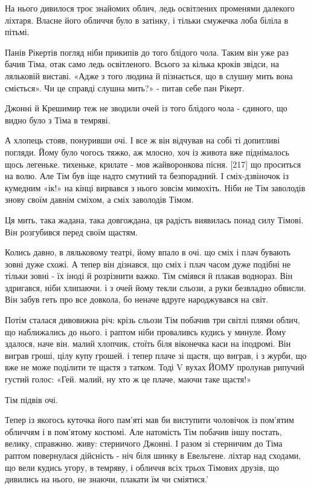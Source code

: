 На нього дивилося троє знайомих облич, ледь освітлених променями далекого ліхтаря. Власне його обличчя було в затінку, і тільки смужечка лоба біліла в пітьмі.

Панів Рікертів погляд ніби прикипів до того блідого чола. Таким він уже раз бачив Тіма, отак само ледь освітленого. Всього за кілька кроків звідси, на ляльковій виставі. «Адже з того людина й пізнається, що в слушну мить вона сміється». Чи це справді слушна мить?» - питав себе пан Рікерт.

Джонні й Крешимир теж не зводили очей із того блідого чола - єдиного, що видно було з Тіма в темряві.

А хлопець стояв, понуривши очі. І все ж він відчував на собі ті допитливі погляди. Йому було чогось тяжко, аж млосно, хоч із живота вже піднімалось щось легеньке. тихеньке, крилате - мов жайворонкова пісня. [217] що проситься на волю. Але Тім був іще надто смутний та безпорадний. І сміх-дзвіночок із кумедним «ік!» на кінці вирвався з нього зовсім мимохіть. Ніби не Тім заволодів знову своїм давнім сміхом, а сміх заволодів Тімом.

Ця мить, така жадана, така довгождана, ця радість виявилась понад силу Тімові. Він розгубився перед своїм щастям.

Колись давно, в ляльковому театрі, йому впало в очі. що сміх і плач бувають зовні дуже схожі. А тепер він дізнався, що сміх і плач часом дуже подібні не тільки зовні - їх іноді й розрізнити важко. Тім сміявся й плакав воднораз. Він здригався, ніби хлипаючи. і з очей йому текли сльози, а руки безвладно обвисли. Він забув геть про все довкола, бо неначе вдруге народжувався на світ.

Потім сталася дивовижна річ: крізь сльози Тім побачив три світлі плями облич, що наближались до нього. і раптом ніби проваливсь кудись у минуле. Йому здалося, наче він. малий хлопчик, стоїть біля віконечка каси на іподромі. Він виграв гроші, цілу купу грошей. і тепер плаче зі щастя, що виграв, і з журби, що вже не може поділити те щастя з татком. Тоді V вухах ЙОМУ пролунав рипучий густий голос: «Гей. малий, ну хто ж це плаче, маючи таке щастя!»

Тім підвів очі.

Тепер із якогось куточка його пам'яті мав би виступити чоловічок із пом'ятим обличчям і в пом'ятому костюмі. Але натомість Тім побачив іншу постать, велику, справжню. живу: стерничого Джонні. І разом зі стерничим до Тіма раптом повернулася дійсність - ніч біля шинку в Евельгене. ліхтар над сходами, що вели кудись угору, в темряву, і обличчя всіх трьох Тімових друзів, що дивились на нього, не знаючи, плакати їм чи сміятися.'

